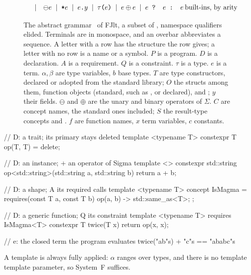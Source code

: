 \begin{figure}[!htbp]
\[\begin{array}{lcl@{\hspace{0.2em}}l}
  & \mid & \ominus e \;\mid\; \texttt{*}e \;\mid\; e\texttt{.}y \;\mid\; \tau\texttt{(}e\texttt{)} \;\mid\; e \oplus e \;\mid\; e \texttt{ ? } e \texttt{ : } e & \text{built-ins, by arity} \\
\end{array}
\]
\caption{The abstract grammar~\cite{pierce2002tapl} of FJlt, a subset of , namespace qualifiers elided.
Terminals are in monospace, and an overbar abbreviates a sequence.
A letter with a row has the structure the row gives; a letter with no row is a name or a symbol.
$P$ is a program.
$D$ is a declaration.
$A$ is a requirement.
$Q$ is a constraint.
$\tau$ is a type.
$e$ is a term.
$\alpha, \beta$ are type variables, $b$ base types.
$T$ are type constructors, declared or adopted from the standard library; $O$ the structs among them, function objects (standard, such as , or declared),  and ; $y$ their fields.
$\ominus$ and $\oplus$ are the unary and binary operators of $\Sigma$.
$C$ are concept names, the standard ones included; $S$ the result-type concepts  and .
$f$ are function names, $x$ term variables, $c$ constants.}
\label{fig:fjlt-syntax}
\end{figure}

\begin{listing}[htbp]
\begin{minipage}[t]{0.48\linewidth}
\begin{cpp}
// D: a trait; its primary stays deleted
template <typename T>
constexpr T op(T, T) = delete;

// D: an instance; + an operator of Sigma
template <>
constexpr std::string
op<std::string>(std::string a, std::string b) {
  return a + b;
}
\end{cpp}
\end{minipage}\hfill
\begin{minipage}[t]{0.48\linewidth}
\begin{cpp}
// D: a shape; A its required calls
template <typename T>
concept IsMagma =
    requires(const T a, const T b) {
      { op(a, b) } -> std::same_as<T>;
    };

// D: a generic function; Q its constraint
template <typename T> requires IsMagma<T>
constexpr T twice(T x) {
  return op(x, x);
}

// e: the closed term the program evaluates
twice("ab"s) + "c"s == "ababc"s
\end{cpp}
\end{minipage}
\caption{A small program, each declaration labelled with its form in Figure~\ref{fig:fjlt-syntax}; its \texttt{\"\"s} literals are sugar.}
\label{lst:fjlt-reading}
\end{listing}

A template is always fully applied: $\alpha$ ranges over types, and there is no template template parameter, so System~F suffices.
